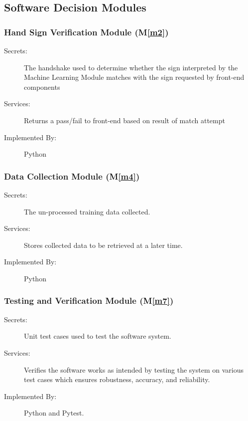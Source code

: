 \documentclass[12pt, titlepage]{article}
\newcommand{\mref}[1]{M\ref{#1}}
\begin{document}
\subsection{Software Decision Modules}


\subsubsection{Hand Sign Verification Module (\mref{m2})}
\begin{description}
\item[Secrets:] The handshake used to determine whether the sign interpreted by the Machine Learning Module matches with the sign requested by front-end components
\item[Services:] Returns a pass/fail to front-end based on result of match attempt
\item[Implemented By:] Python
\end{description}

\subsubsection{Data Collection Module (\mref{m4})}

\begin{description}
\item[Secrets:] The un-processed training data collected.
\item[Services:] Stores collected data to be retrieved at a later time.
\item[Implemented By:] Python
\end{description}

\subsubsection{Testing and Verification Module (\mref{m7})}
\begin{description}
\item[Secrets:] Unit test cases used to test the software system.
\item[Services:] Verifies the software works as intended by testing the system on various test cases which ensures robustness, accuracy, and reliability.
\item[Implemented By:] Python and Pytest.
\end{description}
\end{document}
